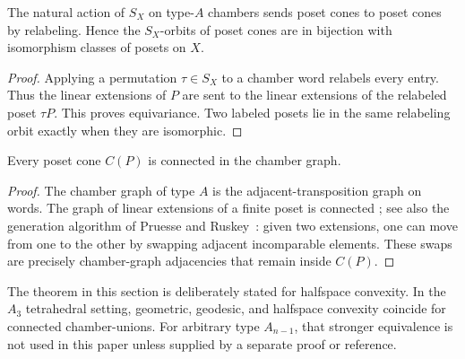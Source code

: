 \begin{proposition}
\label{prop:orbit-dictionary}
The natural action of $S_X$ on type-$A$ chambers sends poset cones to
poset cones by relabeling.  Hence the $S_X$-orbits of poset cones are in
bijection with isomorphism classes of posets on $X$.
\end{proposition}

\begin{proof}
Applying a permutation $\tau\in S_X$ to a chamber word relabels every
entry.  Thus the linear extensions of $P$ are sent to the linear
extensions of the relabeled poset $\tau P$.  This proves equivariance.
Two labeled posets lie in the same relabeling orbit exactly when they are
isomorphic.
\end{proof}

\begin{proposition}[Connectivity]
\label{prop:linear-extension-connected}
Every poset cone $C(P)$ is connected in the chamber graph.
\end{proposition}

\begin{proof}
The chamber graph of type $A$ is the adjacent-transposition graph on
words.  The graph of linear extensions of a finite poset is connected
\cite[Sec.~3.5]{Stanley2012}; see also the generation algorithm of
Pruesse and Ruskey~\cite{PruesseRuskey1994}:
given two extensions, one can move from one to the other by swapping
adjacent incomparable elements.  These swaps are precisely chamber-graph
adjacencies that remain inside $C(P)$.
\end{proof}

\begin{remark}
The theorem in this section is deliberately stated for
halfspace convexity.  In the $A_3$ tetrahedral setting, geometric,
geodesic, and halfspace convexity coincide for connected chamber-unions.
For arbitrary type $A_{n-1}$, that stronger equivalence is not used in
this paper unless supplied by a separate proof or reference.
\end{remark}

